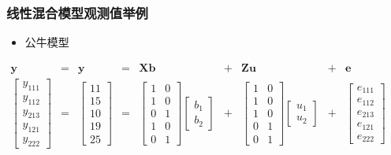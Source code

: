 \documentclass[serif,aspectratio=169]{beamer}
\begin{document}
\begin{frame}
\begin{columns}
\begin{frame}
  \frametitle{线性混合模型观测值举例}
  \begin{itemize}
  \item 公牛模型
  \end{itemize}
  $$
  \begin{array}{ccccccccc}
    \mathbf{y} & = & \mathbf{y} & = & \mathbf{Xb} & + & \mathbf{Zu} & + & \mathbf{e}\\
    \left[\begin{array}{c}
        y_{111}\\
        y_{112}\\
        y_{213}\\
        y_{121}\\
        y_{222}
      \end{array}\right] & = &
    \left[\begin{array}{c}
        11\\
        15\\
        10\\
        19\\
        25
      \end{array}\right] & = &
    \left[\begin{array}{cc}
        1 & 0\\
        1 & 0\\
        0 & 1\\
        1 & 0\\
        0 & 1
      \end{array}\right]
    \left[\begin{array}{c}b_1\\b_2\end{array}\right] & + &
    \left[\begin{array}{cc}
        1 & 0\\
        1 & 0\\
        1 & 0\\
        0 & 1\\
        0 & 1
      \end{array}\right]
    \left[\begin{array}{c}u_1\\u_2\end{array}\right] & + &
    \left[\begin{array}{c}
        e_{111}\\
        e_{112}\\
        e_{213}\\
        e_{121}\\
        e_{222}
      \end{array}\right]
  \end{array}
  $$
  

\end{frame}
\end{columns}
\end{frame}
\end{document}
